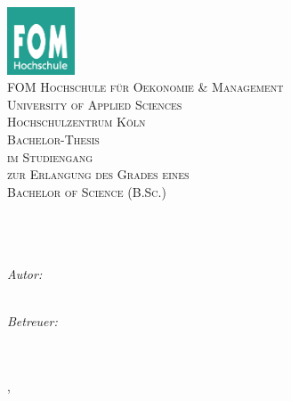 \begin{titlepage}
\begin{center}

\includegraphics[width=0.15\textwidth]{./Anhang/fom}~\\[1cm]

\textsc{\MYLARGE FOM Hochschule für Oekonomie \& Management}\\[0.5cm]
\textsc{\MyLarge University of Applied Sciences}\\[0.5cm]
\textsc{\MyLarge Hochschulzentrum Köln }\\[1.5cm]


\textsc{\MyLarge Bachelor-Thesis}\\[0.5cm]
\textsc{\MyLarge im Studiengang \studiengang~}\\[1.5cm]


\textsc{\MyLarge zur Erlangung des Grades eines}\\[0.5cm]
\textsc{\MyLarge Bachelor of Science (B.Sc.)}\\[0.5cm]

\HRule~\\[1cm]
{ \MYLARGE  \bfseries \titel~\\[1cm] }
\HRule~\\[1cm]



\noindent
\begin{minipage}{0.4\textwidth}
\begin{flushleft} \mylarge
\emph{Autor:}\\
\autor~\\
\end{flushleft}
\end{minipage}%
\begin{minipage}{0.4\textwidth}
\begin{flushright} \mylarge
\emph{Betreuer:} \\
\betreuer~\\~
\end{flushright}
\end{minipage}

\vfill
{\mylarge \ort, \Abgabedatum}\\[0.5cm]


\end{center}
\end{titlepage}
